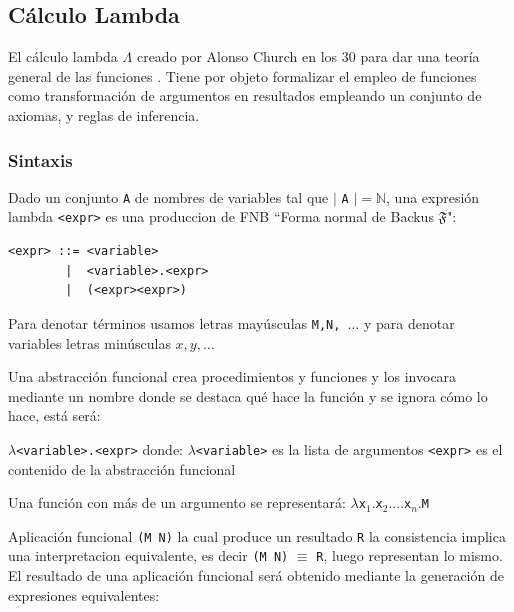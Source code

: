 \subsection{Cálculo Lambda}

El cálculo lambda $\Lambda$ creado por Alonso Church en los 30 para dar una teoría general de las funciones \cite{Bar1998}. Tiene por objeto formalizar el empleo de funciones como transformación de argumentos en resultados empleando un conjunto de axiomas, y reglas de inferencia.

\subsubsection{Sintaxis}

Dado un conjunto \texttt{A} de nombres de variables tal que $\vert$ 
\texttt{A} $\vert = \mathbb{N}$, una expresión lambda \texttt{<expr>} es una produccion de FNB ``Forma normal de Backus $\mathfrak{F}$":

\begin{verbatim}
<expr> ::= <variable> 
        |  <variable>.<expr> 
        |  (<expr><expr>)
\end{verbatim}

\begin{note}
Para denotar términos usamos letras mayúsculas \texttt{M,N, $\dots$} y para denotar variables letras  minúsculas \texttt{$x,y, \dots$}
\end{note}

Una abstracción funcional crea procedimientos y funciones y los invocara mediante un nombre donde se destaca qué hace la función y se ignora cómo lo hace, está será:

\texttt{$\lambda$<variable>.<expr>}
donde:
\texttt{$\lambda$<variable>} es la lista de argumentos
\texttt{<expr>} es el contenido de la abstracción funcional

Una función con más de un argumento se representará:
\texttt{$\lambda $x$_1. $x$_2. \dots $x$_n. $M}

\begin{defn}\end{defn}

Aplicación funcional  \texttt{(M N)} la cual produce un resultado \texttt{R} la consistencia implica una interpretacion equivalente,
es decir \texttt{(M N)} $\equiv$ \texttt{R}, luego representan lo mismo.
El resultado de una aplicación funcional será obtenido mediante la generación de expresiones equivalentes:


